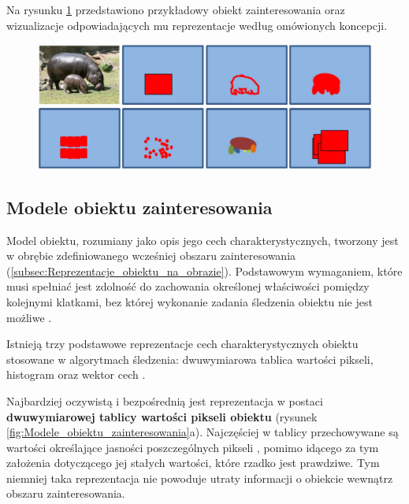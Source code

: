 Na rysunku \ref{fig:Reprezentacje_obiektu_na_obrazie} przedstawiono przykładowy obiekt zainteresowania oraz wizualizacje odpowiadających mu reprezentacje według omówionych koncepcji.

\begin{figure}[!htb]
	\begin{center}
		\includegraphics[width=12cm]{images/target_region_representation.png}
	\end{center}	
\label{fig:Reprezentacje_obiektu_na_obrazie}
\end{figure}

\subsection{Modele obiektu zainteresowania}
\label{subsec:Modele_obiektu_zainteresowania}

Model obiektu, rozumiany jako opis jego cech charakterystycznych, tworzony jest w obrębie zdefiniowanego wcześniej obszaru zainteresowania (\ref{subsec:Reprezentacje_obiektu_na_obrazie}). Podstawowym wymaganiem, które musi spełniać jest zdolność do zachowania określonej właściwości pomiędzy kolejnymi klatkami, bez której wykonanie zadania śledzenia obiektu nie jest możliwe \cite{Smeulders2010}.

Istnieją trzy podstawowe reprezentacje cech charakterystycznych obiektu stosowane w algorytmach śledzenia: dwuwymiarowa tablica wartości pikseli, histogram oraz wektor cech \cite{Smeulders2010}.

Najbardziej oczywistą i bezpośrednią jest reprezentacja w postaci \textbf{dwuwymiarowej tablicy wartości pikseli obiektu} (rysunek \ref{fig:Modele_obiektu_zainteresowania}a). Najczęściej w tablicy przechowywane są wartości określające jasności poszczególnych pikseli \cite{Smeulders2010}, pomimo idącego za tym założenia dotyczącego jej stałych wartości, które rzadko jest prawdziwe. Tym niemniej taka reprezentacja nie powoduje utraty informacji o obiekcie wewnątrz obszaru zainteresowania.

